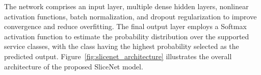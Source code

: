 \documentclass[12pt,a4paper]{report}
\begin{document}
	The network comprises an input layer, multiple dense hidden layers, nonlinear activation functions, batch normalization, and dropout regularization to improve convergence and reduce overfitting. The final output layer employs a Softmax activation function to estimate the probability distribution over the supported service classes, with the class having the highest probability selected as the predicted output. Figure~\ref{fig:slicenet_architecture} illustrates the overall architecture of the proposed SliceNet model.

\end{document}
